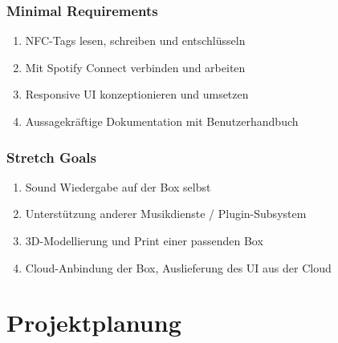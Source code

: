 \documentclass[10pt, a4paper, draft]{article}
\begin{document}
\subsubsection{Minimal Requirements}
\begin{enumerate}
  \item NFC-Tags lesen, schreiben und entschlüsseln
  \item Mit Spotify Connect verbinden und arbeiten
  \item Responsive UI konzeptionieren und umsetzen
  \item Aussagekräftige Dokumentation mit Benutzerhandbuch
\end{enumerate}
\subsubsection{Stretch Goals}
\begin{enumerate}
  \item Sound Wiedergabe auf der Box selbst
  \item Unterstützung anderer Musikdienste / Plugin-Subsystem
  \item 3D-Modellierung und Print einer passenden Box
  \item Cloud-Anbindung der Box, Auslieferung des UI aus der Cloud
\end{enumerate}

\section{Projektplanung}
\end{document}
